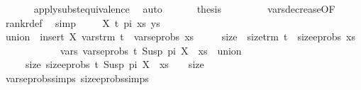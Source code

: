 \begin{isabellebody}
\ \ \ \ \ \isamarkupfalse%
\ apply{\isacharunderscore}{\kern0pt}subst{\isacharunderscore}{\kern0pt}equivalence\ \isamarkupfalse%
\ auto\isanewline
\ \ \ \isamarkupfalse%
\ \isamarkupfalse%
\ {\isacharquery}{\kern0pt}thesis\ \ \isanewline
\ \ \ \ \isamarkupfalse%
\ {}\ vars{\isacharunderscore}{\kern0pt}decrease{\isacharbrackleft}{\kern0pt}OF\ {}{\isacharparenleft}{\kern0pt}{}{\isacharparenright}{\kern0pt}{\isacharbrackright}{\kern0pt}\ \isamarkupfalse%
\ rank{\isacharunderscore}{\kern0pt}r{\isacharunderscore}{\kern0pt}def\ \isamarkupfalse%
\ simp\isanewline
{}\isamarkupfalse%
\isanewline
\ \ \isamarkupfalse%
\ {\isacharparenleft}{\kern0pt}{}\ X\ t\ pi\ xs\ ys{\isacharparenright}{\kern0pt}\isanewline
\ \ \ \isamarkupfalse%
\ {\isacharquery}{\kern0pt}union\ {\isacharequal}{\kern0pt}\ {\isachardoublequoteopen}insert\ X\ {\isacharparenleft}{\kern0pt}vars{\isacharunderscore}{\kern0pt}trm\ t\ {\isasymunion}\ vars{\isacharunderscore}{\kern0pt}eprobs\ xs{\isacharparenright}{\kern0pt}{\isachardoublequoteclose}\isanewline
\ \ \ \ \ {\isacharquery}{\kern0pt}size\ {\isacharequal}{\kern0pt}\ {\isachardoublequoteopen}size{\isacharunderscore}{\kern0pt}trm\ t\ {\isacharplus}{\kern0pt}\ size{\isacharunderscore}{\kern0pt}eprobs\ xs{\isachardoublequoteclose}\isanewline
\ \ \isamarkupfalse%
\ {}\ \isamarkupfalse%
\ \isanewline
\ \ \ \ \ vars{\isacharcolon}{\kern0pt}\ {\isachardoublequoteopen}vars{\isacharunderscore}{\kern0pt}eprobs\ {\isacharparenleft}{\kern0pt}{\isacharparenleft}{\kern0pt}t{\isacharcomma}{\kern0pt}\ Susp\ pi\ X{\isacharparenright}{\kern0pt}\ {\isacharhash}{\kern0pt}\ xs{\isacharparenright}{\kern0pt}\ {\isacharequal}{\kern0pt}\ {\isacharquery}{\kern0pt}union{\isachardoublequoteclose}\ \isanewline
\ \ \ \ \ size{\isacharcolon}{\kern0pt}\ {\isachardoublequoteopen}size{\isacharunderscore}{\kern0pt}eprobs\ {\isacharparenleft}{\kern0pt}{\isacharparenleft}{\kern0pt}t{\isacharcomma}{\kern0pt}\ Susp\ pi\ X{\isacharparenright}{\kern0pt}\ {\isacharhash}{\kern0pt}\ xs{\isacharparenright}{\kern0pt}\ {\isacharequal}{\kern0pt}\ {}\ {\isacharplus}{\kern0pt}\ {\isacharquery}{\kern0pt}size{\isachardoublequoteclose}\isanewline
\ \ \ \ \isamarkupfalse%
\ vars{\isacharunderscore}{\kern0pt}eprobs{\isachardot}{\kern0pt}simps\ size{\isacharunderscore}{\kern0pt}eprobs{\isachardot}{\kern0pt}simps\ \isamarkupfalse%

\end{isabellebody}
